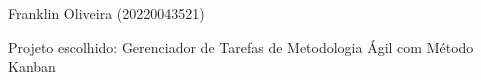 Franklin Oliveira (20220043521)

Projeto escolhido\+: Gerenciador de Tarefas de Metodologia Ágil com Método Kanban 
